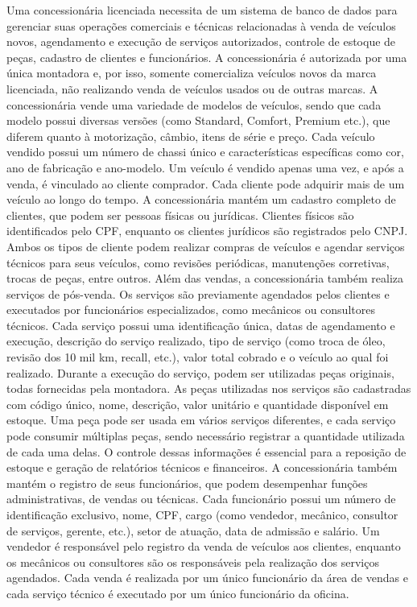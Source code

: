 \documentclass{article}
\begin{document}
Uma concessionária licenciada necessita de um sistema de banco de dados para gerenciar suas operações comerciais e técnicas relacionadas à venda de veículos novos, agendamento e execução de serviços autorizados, controle de estoque de peças, cadastro de clientes e funcionários. A concessionária é autorizada por uma única montadora e, por isso, somente comercializa veículos novos da marca licenciada, não realizando venda de veículos usados ou de outras marcas.
A concessionária vende uma variedade de modelos de veículos, sendo que cada modelo possui diversas versões (como Standard, Comfort, Premium etc.), que diferem quanto à motorização, câmbio, itens de série e preço. Cada veículo vendido possui um número de chassi único e características específicas como cor, ano de fabricação e ano-modelo. Um veículo é vendido apenas uma vez, e após a venda, é vinculado ao cliente comprador. Cada cliente pode adquirir mais de um veículo ao longo do tempo.
A concessionária mantém um cadastro completo de clientes, que podem ser pessoas físicas ou jurídicas. Clientes físicos são identificados pelo CPF, enquanto os clientes jurídicos são registrados pelo CNPJ. Ambos os tipos de cliente podem realizar compras de veículos e agendar serviços técnicos para seus veículos, como revisões periódicas, manutenções corretivas, trocas de peças, entre outros.
Além das vendas, a concessionária também realiza serviços de pós-venda. Os serviços são previamente agendados pelos clientes e executados por funcionários especializados, como mecânicos ou consultores técnicos. Cada serviço possui uma identificação única, datas de agendamento e execução, descrição do serviço realizado, tipo de serviço (como troca de óleo, revisão dos 10 mil km, recall, etc.), valor total cobrado e o veículo ao qual foi realizado. Durante a execução do serviço, podem ser utilizadas peças originais, todas fornecidas pela montadora.
As peças utilizadas nos serviços são cadastradas com código único, nome, descrição, valor unitário e quantidade disponível em estoque. Uma peça pode ser usada em vários serviços diferentes, e cada serviço pode consumir múltiplas peças, sendo necessário registrar a quantidade utilizada de cada uma delas. O controle dessas informações é essencial para a reposição de estoque e geração de relatórios técnicos e financeiros.
A concessionária também mantém o registro de seus funcionários, que podem desempenhar funções administrativas, de vendas ou técnicas. Cada funcionário possui um número de identificação exclusivo, nome, CPF, cargo (como vendedor, mecânico, consultor de serviços, gerente, etc.), setor de atuação, data de admissão e salário. Um vendedor é responsável pelo registro da venda de veículos aos clientes, enquanto os mecânicos ou consultores são os responsáveis pela realização dos serviços agendados. Cada venda é realizada por um único funcionário da área de vendas e cada serviço técnico é executado por um único funcionário da oficina.
\end{document}
